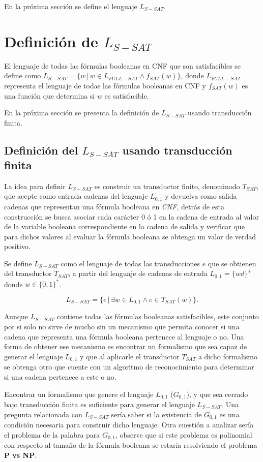 En la próxima sección se define el lenguaje $L_{S-SAT}$.

\section{Definición de $L_{S-SAT}$}

El lenguaje de todas las fórmulas booleanas en CNF que son satisfacibles se define como $L_{S-SAT}=\{w\,|\,w \in L_{FULL-SAT} \wedge f_{SAT}(w)\}$, 
donde $L_{FULL-SAT}$ representa el lenguaje de todas las fórmulas booleanas en CNF y $f_{SAT}(w)$
es una función que determina si $w$ es satisfacible.

En la próxima sección se presenta la definición de $L_{S-SAT}$ usando transducción finita.

\subsection{Definición del $L_{S-SAT}$ usando transducción finita}

La idea para definir $L_{S-SAT}$ es construir un transductor finito, denominado $T_{SAT}$, que acepte como entrada cadenas del lenguaje $L_{0,1}$
y devuelva como salida cadenas que representan una fórmula booleana en \textit{CNF}, detrás de esta construcción se busca asociar cada carácter 0 ó 1 en la cadena de entrada al valor de la variable booleana correspondiente en la cadena de salida y verificar que para dichos valores al evaluar la fórmula booleana se obtenga un valor de verdad positivo.

Se define $L_{S-SAT}$ como el lenguaje de todas las transducciones $e$ que se obtienen del transductor $T_{SAT}$, a partir del lenguaje de cadenas de entrada $L_{0,1}=\{wd\}^+$ donde $w\in \{0,1\}^*$.

$$L_{S-SAT} = \{e\,|\,\exists w \in L_{0,1} \wedge e \in T_{SAT}(w) \}.$$

Aunque $L_{S-SAT}$ contiene todas las fórmulas booleanas satisfacibles, este conjunto por si solo no sirve de 
mucho sin un mecanismo que permita conocer si una cadena que representa una fórmula booleana pertenece al 
lenguaje o no. Una forma de obtener ese mecanismo es encontrar un formalismo que sea capaz de generar el 
lenguaje $L_{0,1}$ y que al aplicarle el transductor $T_{SAT}$ a dicho formalismo se obtenga otro que 
cuente con un algoritmo de reconocimiento para determinar si una cadena pertenece a este o no.

Encontrar un formalismo que genere el lenguaje $L_{0,1}$ ($G_{0,1}$), y que sea cerrado bajo transducción finita es 
suficiente para generar el lenguaje $L_{S-SAT}$. Una pregunta relacionada con $L_{S-SAT}$ sería saber si la 
existencia de $G_{0,1}$ es una condición necesaria para construir dicho lenguaje.  Otra cuestión a analizar
sería el problema de la palabra para $G_{0,1}$, observe que si este problema es polinomial con respecto al tamaño
de la fórmula booleana se estaría resolviendo el problema \textbf{P vs NP}.

